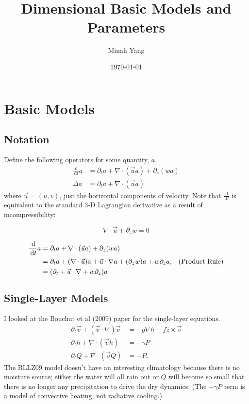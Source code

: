 \documentclass[10pt]{article}
\title{Dimensional Basic Models and Parameters}
\author{Minah Yang}
\date{\today}
\newcommand{\rmd}{\,\mathrm{d}}
\begin{document}
\maketitle
\section{Basic Models}
\subsection{Notation}
Define the following operators for some quantity, $a$.
\begin{align*}
\frac{\rmd}{\rmd t} a &= \partial_t a + \nabla \cdot \left(\vec{u}a\right) + \partial_z (wa)\\
\Delta a &= \partial_t a + \nabla \cdot \left(\vec{u}a\right)
\end{align*}
where $\vec{u} = (u,v)$, just the horizontal components of velocity.
Note that $\frac{\rmd}{\rmd t}$ is equivalent to the standard 3-D Lagrangian derivative as a result of  incompressibility: 

\begin{equation}
\nabla \cdot \vec{u} +\partial_z w= 0
\label{incoma}
\end{equation}

\begin{align*}
\frac{\rmd}{\rmd t} a &= \partial_t a + \nabla \cdot \left(\vec{u}a\right) + \partial_z (wa)\\
&= \partial_t a + (\nabla \cdot \vec{u}) a + \vec{u} \cdot \nabla a + (\partial_z w)a + w \partial_z a  \text{,\quad (Product Rule)}\\
&= (\partial_t  +\vec{u} \cdot \nabla  +w \partial_z) a
\end{align*}
\subsection{Single-Layer Models}
I looked at the Bouchut et al (2009) paper for the single-layer equations.
\begin{align}
\partial_t \vec{v} + \left( \vec{v}\cdot \nabla \right)\vec{v} &= -g\nabla h - f\hat{z}\times \vec{v}\\
\partial_t h + \nabla \cdot \left(\vec{v}h\right) &= -\gamma P \\%
\partial_t Q + \nabla \cdot \left(\vec{v}Q\right) &= -P. \label{eq3}
\end{align}
The BLLZ09 model doesn't have an interesting climatology because there is no moisture source; either the water will all rain out or $Q$ will become so small that there is no longer any precipitation to drive the dry dynamics.
(The $-\gamma P$ term is a model of convective heating, not radiative cooling.) 
\end{document}
